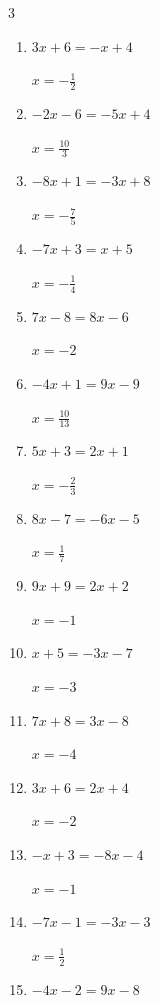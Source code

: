\begin{multicols}{3}
\begin{enumerate}
  \item $3x+6=-x+4$

        $\displaystyle x=-\frac{1}{2}$

  \item $-2x-6=-5x+4$

        $\displaystyle x=\frac{10}{3}$

  \item $-8x+1=-3x+8$

        $\displaystyle x=-\frac{7}{5}$

  \item $-7x+3=x+5$

        $\displaystyle x=-\frac{1}{4}$

  \item $7x-8=8x-6$

        $\displaystyle x=-2$

  \item $-4x+1=9x-9$

        $\displaystyle x=\frac{10}{13}$

  \item $5x+3=2x+1$

        $\displaystyle x=-\frac{2}{3}$

  \item $8x-7=-6x-5$

        $\displaystyle x=\frac{1}{7}$

\columnbreak %

  \item $9x+9=2x+2$

        $\displaystyle x=-1$

  \item $x+5=-3x-7$

        $\displaystyle x=-3$

  \item $7x+8=3x-8$

        $\displaystyle x=-4$

  \item $3x+6=2x+4$

        $\displaystyle x=-2$

  \item $-x+3=-8x-4$

        $\displaystyle x=-1$

  \item $-7x-1=-3x-3$

        $\displaystyle x=\frac{1}{2}$

  \item $-4x-2=9x-8$


\end{enumerate}
\end{multicols}
